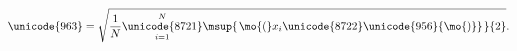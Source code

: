 

    \[\let\par\empty

    
{
\unicode{963}
=
\sqrt{
{
{\frac{{
{1}
}}{{
N
}}}
{
{
{\mathop{{
\unicode{8721}
}}\limits\sb{{
i
=
{1}
}}\sp{{
N
}}}
{
{\msup{{\left.
{\mo{(}}
{{{
x
}}\sb{{
i
}}}
\unicode{8722}
\unicode{956}
{\mo{)}}
\right.}}{{
{2}
}}}
}
}
}
}
}
.
}


    \]

  